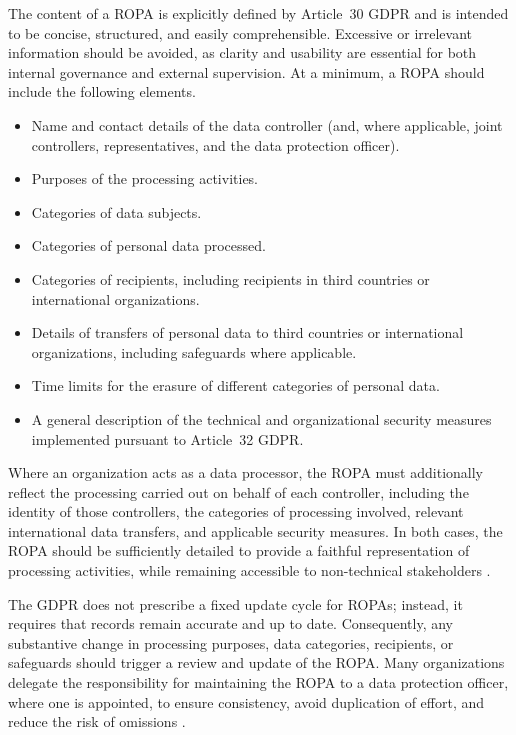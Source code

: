The content of a ROPA is explicitly defined by Article~30 GDPR and is intended to be concise, structured, and easily comprehensible. Excessive or irrelevant information should be avoided, as clarity and usability are essential for both internal governance and external supervision. At a minimum, a ROPA should include the following elements.

\begin{itemize}
  \item Name and contact details of the data controller (and, where applicable, joint controllers, representatives, and the data protection officer).
  \item Purposes of the processing activities.
  \item Categories of data subjects.
  \item Categories of personal data processed.
  \item Categories of recipients, including recipients in third countries or international organizations.
  \item Details of transfers of personal data to third countries or international organizations, including safeguards where applicable.
  \item Time limits for the erasure of different categories of personal data.
  \item A general description of the technical and organizational security measures implemented pursuant to Article~32 GDPR.
\end{itemize}

Where an organization acts as a data processor, the ROPA must additionally reflect the processing carried out on behalf of each controller, including the identity of those controllers, the categories of processing involved, relevant international data transfers, and applicable security measures. In both cases, the ROPA should be sufficiently detailed to provide a faithful representation of processing activities, while remaining accessible to non-technical stakeholders \cite{gdpr-info-art30}.

The GDPR does not prescribe a fixed update cycle for ROPAs; instead, it requires that records remain accurate and up to date. Consequently, any substantive change in processing purposes, data categories, recipients, or safeguards should trigger a review and update of the ROPA. Many organizations delegate the responsibility for maintaining the ROPA to a data protection officer, where one is appointed, to ensure consistency, avoid duplication of effort, and reduce the risk of omissions \cite{gdpr-info-art30, osano-ropa}.

